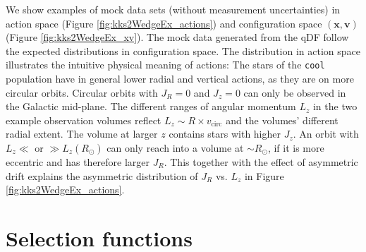 \documentclass[iop,revtex4,numberedappendix,appendixfloats]{emulateapj}
\newcommand{\vect}[1]{\boldsymbol{#1}}
\begin{document}
We show examples of mock data sets (without measurement uncertainties) in action space (Figure \ref{fig:kks2WedgeEx_actions}) and configuration space $(\vect{x},\vect{v})$ (Figure \ref{fig:kks2WedgeEx_xv}). The mock data generated from the qDF follow the expected distributions in configuration space. The distribution in action space illustrates the intuitive physical meaning of actions: The stars of the \texttt{cool} population have in general lower radial and vertical actions, as they are on more circular orbits. Circular orbits with $J_R = 0$ and $J_z = 0$ can only be observed in the Galactic mid-plane. The different ranges of angular momentum $L_z$ in the two example observation volumes reflect $L_z \sim R \times v_\text{circ}$ and the volumes' different radial extent. The volume at larger $z$ contains stars with higher $J_z$. An orbit with $L_z \ll$ or $\gg L_z(R_\odot)$ can only reach into a volume at $\sim R_\odot$, if it is more eccentric and has therefore larger $J_R$. This together with the effect of asymmetric drift explains the asymmetric distribution of $J_R$ vs. $L_z$ in Figure \ref{fig:kks2WedgeEx_actions}.

\section{Selection functions} \label{app:selectionfunction}
\end{document}
